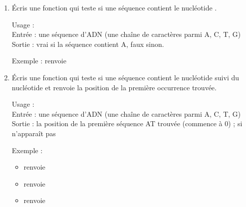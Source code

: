 \documentclass[11pt,class=report,crop=false]{standalone}
\begin{document}

\begin{activite}[ADN]

\begin{enumerate}
  \item Écris une fonction  qui teste si une séquence contient le nucléotide .
  
  \begin{fonction}[\ci{presence_de_A()}]
  Usage :  \\
  Entrée : une séquence d'ADN (une chaîne de caractères parmi A, C, T, G) \\
  Sortie : \og{}vrai\fg{} si la séquence contient \og{}A\fg{}, \og{}faux\fg{} sinon.
  
  \medskip
    
  Exemple :  renvoie 
  \end{fonction}
  
  \item Écris une fonction  qui teste si une séquence contient le nucléotide  suivi du nucléotide  et renvoie la position de la première occurrence trouvée.
  
  \begin{fonction}[\ci{position_de_AT()}]
  Usage :  \\
  Entrée : une séquence d'ADN (une chaîne de caractères parmi A, C, T, G) \\
  Sortie : la position de la première séquence \og{}AT\fg{} trouvée (commence à 0) ;  si n'apparaît pas
  
  \medskip
    
  Exemple : 
  \begin{itemize}  
    \item {} renvoie 
    \item {} renvoie 
    \item {} renvoie 
  \end{itemize} 
  \end{fonction}
  

\end{enumerate}
\end{activite}
\end{document}

